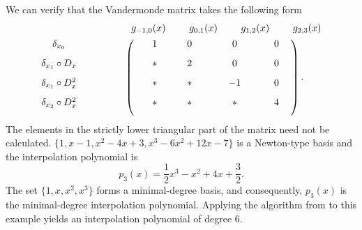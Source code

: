 \documentclass[preprint,12pt]{elsarticle}
\begin{document}
We can verify that the Vandermonde matrix takes the following form
\[
\begin{array}{c@{\hspace{8pt}}c}
  & \begin{array}{ccccc}
      \text{} & g_{-1,0}(x) & g_{0,1}(x) & g_{1,2}(x) & g_{2,3}(x) \\[4pt]
    \end{array} \\[2pt]
  \begin{array}{c}
  \renewcommand{\arraystretch}{2.5}
    \delta_{x_0} \\[8pt]
    \delta_{x_1}\circ D_x \\[8pt]
    \delta_{x_1}\circ D_x^2 \\[8pt]
     \delta_{x_2}\circ D_x^2  \\[8pt]
  \end{array}
  &  
  \left(
  \renewcommand{\arraycolsep}{12pt}
  \renewcommand{\arraystretch}{1.0} 
    \begin{array}{cccc}
     ~~ 1      &~~ 0      & ~~~~0    & ~~~0 \\[8pt]  
      ~~*      & ~~2      & ~~~~0    &~~~ 0 \\[8pt]  
      ~~*      & ~~*      & ~~~~-1    &~~~ 0 \\[8pt]  
      ~~*      & ~~*      & ~~~~*    &~~~ 4 \\[8pt]  
    \end{array}
  \right).
\end{array}
\]
The elements in the strictly lower triangular part of the matrix need not be calculated. $\{1, x-1, x^2-4x+3, x^3-6x^2+12x-7\}$ is a Newton-type basis and the interpolation polynomial is
\begin{displaymath}
p_3(x)=\frac{1}{2}x^3-x^2+4x+\frac{3}{2}.
\end{displaymath}
The set $\{1, x, x^2, x^3\}$ forms a minimal-degree basis, and consequently, $p_3(x)$ is the minimal-degree interpolation polynomial.
Applying the algorithm from \cite{wen27} to this example yields an interpolation polynomial of degree 6.
\end{document}
